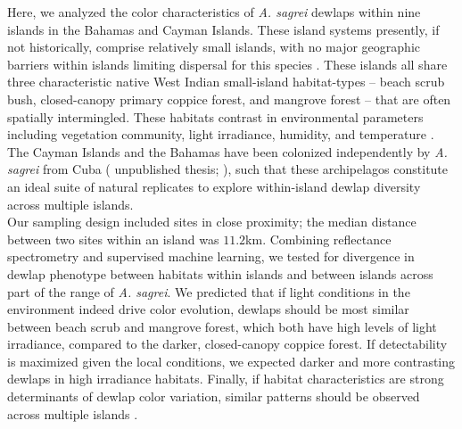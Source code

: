 Here, we analyzed the color characteristics of \textit{A. sagrei} dewlaps within nine islands in the Bahamas and Cayman Islands. These island systems presently, if not historically, comprise relatively small islands, with no major geographic barriers within islands limiting dispersal for this species \citep{Kamath2018}. These islands all share three characteristic native West Indian small-island habitat-types -- beach scrub bush, closed-canopy primary coppice forest, and mangrove forest -- that are often spatially intermingled. These habitats contrast in environmental parameters including vegetation community, light irradiance, humidity, and temperature \citep{Howard1950, Schoener1968}. The Cayman Islands and the Bahamas have been colonized independently by \textit{A. sagrei} from Cuba (\citealt{vandeSchoot2016} unpublished thesis; \citealt{Reynolds2020}), such that these archipelagos constitute an ideal suite of natural replicates to explore within-island dewlap diversity across multiple islands.\\

Our sampling design included sites in close proximity; the median distance between two sites within an island was $11.2$km. Combining reflectance spectrometry and supervised machine learning, we tested for divergence in dewlap phenotype between habitats within islands and between islands across part of the range of \textit{A. sagrei}. We predicted that if light conditions in the environment indeed drive color evolution, dewlaps should be most similar between beach scrub and mangrove forest, which both have high levels of light irradiance, compared to the darker, closed-canopy coppice forest. If detectability is maximized given the local conditions, we expected darker and more contrasting dewlaps in high irradiance habitats. Finally, if habitat characteristics are strong determinants of dewlap color variation, similar patterns should be observed across multiple islands \citep{Harvey1991, Losos2011}.